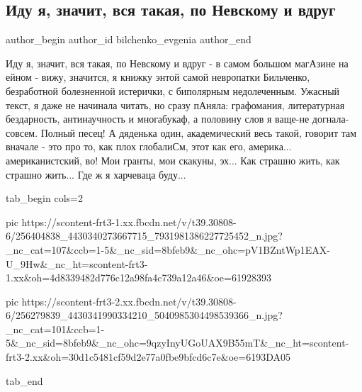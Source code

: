  
 
 
 
 
 
\subsection{Иду я, значит, вся такая, по Невскому и вдруг}
\label{sec:11_11_2021.fb.bilchenko_evgenia.1.nevskij_kniga}
 
\ifcmt
 author_begin
   author_id bilchenko_evgenia
 author_end
\fi

Иду я, значит, вся такая, по Невскому и вдруг - в самом большом магАзине на
ейном - вижу, значится, я книжку энтой самой невропатки Бильченко, безработной
болезненной истерички, с биполярным недолеченным. Ужасный текст, я даже не
начинала читать, но сразу пАняла: графомания, литературная бездарность,
антинаучность и многабукаф, а половину слов я ваще-не догнала-совсем. Полный
песец! А дяденька один, академический весь такой, говорит там вначале - это про
то, как плох глобалиСм, этот как его, америка... американистский, во! Мои
гранты, мои скакуны, эх... Как страшно жить, как страшно жить... Где ж я
харчеваца буду...

\ifcmt
  tab_begin cols=2

     pic https://scontent-frt3-1.xx.fbcdn.net/v/t39.30808-6/256404838_4430340273667715_7931981386227725452_n.jpg?_nc_cat=107&ccb=1-5&_nc_sid=8bfeb9&_nc_ohc=pV1BZntWp1EAX-U_9Hw&_nc_ht=scontent-frt3-1.xx&oh=4d8339482d776c12a98fa4c739a12a46&oe=61928393

     pic https://scontent-frt3-2.xx.fbcdn.net/v/t39.30808-6/256279839_4430341990334210_5040985304498539366_n.jpg?_nc_cat=101&ccb=1-5&_nc_sid=8bfeb9&_nc_ohc=9qzyInyUGoUAX9B55mT&_nc_ht=scontent-frt3-2.xx&oh=30d1c5481cf59d2e77a0fbe9bfcd6c7e&oe=6193DA05

  tab_end
\fi

